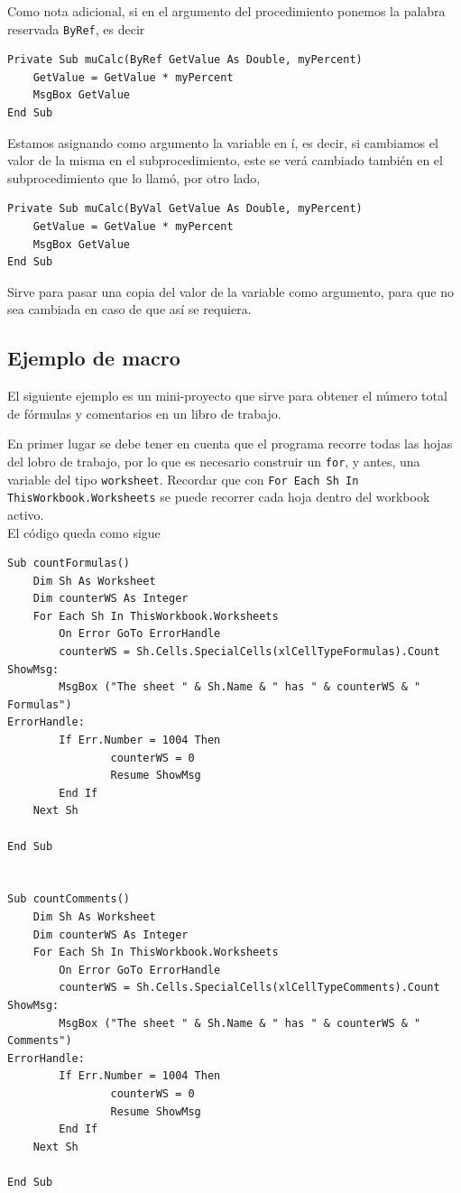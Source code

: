 Como nota adicional, si en el argumento del procedimiento ponemos la palabra reservada \texttt{ByRef}, es decir 

\begin{verbatim}
Private Sub muCalc(ByRef GetValue As Double, myPercent)
    GetValue = GetValue * myPercent
    MsgBox GetValue
End Sub
\end{verbatim}


Estamos asignando como argumento la variable en í, es decir, si cambiamos el valor de la misma en el subprocedimiento, este se verá cambiado también en el subprocedimiento que lo llamó, por otro lado, 



\begin{verbatim}
Private Sub muCalc(ByVal GetValue As Double, myPercent)
    GetValue = GetValue * myPercent
    MsgBox GetValue
End Sub
\end{verbatim}

Sirve para pasar una copia del valor de la variable como argumento, para que no sea cambiada en caso de que así se requiera.

\subsection{Ejemplo de macro}

El siguiente ejemplo es un mini-proyecto que sirve para obtener el número total de fórmulas y comentarios en un libro de trabajo.

En primer lugar se debe tener en cuenta que el programa recorre todas las hojas del lobro de trabajo, por lo que es necesario construir un \texttt{for}, y antes, una variable del tipo \texttt{worksheet}. Recordar que con \texttt{For Each Sh In ThisWorkbook.Worksheets} se puede recorrer cada hoja dentro del workbook activo. \\

El código queda como sigue

\begin{verbatim}
Sub countFormulas()
    Dim Sh As Worksheet
    Dim counterWS As Integer
    For Each Sh In ThisWorkbook.Worksheets
        On Error GoTo ErrorHandle
        counterWS = Sh.Cells.SpecialCells(xlCellTypeFormulas).Count
ShowMsg:
        MsgBox ("The sheet " & Sh.Name & " has " & counterWS & " Formulas")
ErrorHandle:
        If Err.Number = 1004 Then
                counterWS = 0
                Resume ShowMsg
        End If
    Next Sh
    
End Sub


Sub countComments()
    Dim Sh As Worksheet
    Dim counterWS As Integer
    For Each Sh In ThisWorkbook.Worksheets
        On Error GoTo ErrorHandle
        counterWS = Sh.Cells.SpecialCells(xlCellTypeComments).Count
ShowMsg:
        MsgBox ("The sheet " & Sh.Name & " has " & counterWS & " Comments")
ErrorHandle:
        If Err.Number = 1004 Then
                counterWS = 0
                Resume ShowMsg
        End If
    Next Sh
    
End Sub
\end{verbatim}


